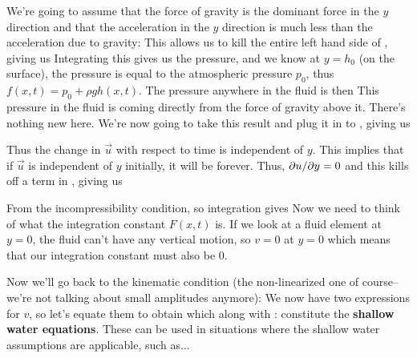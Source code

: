 \documentclass[12pt]{book}
\begin{document}
We're going to assume that the force of gravity is the dominant force in the $y$ direction and that the acceleration in the $y$ direction is much less than the acceleration due to gravity:
This allows us to kill the entire left hand side of , giving us 
Integrating this gives us the pressure,
and we know at $y=h_0$ (on the surface), the pressure is equal to the atmospheric pressure $p_0$, thus
$f(x,t) = p_0 + \rho g h(x,t)$.  The pressure anywhere in the fluid is then
  This pressure in the fluid is coming directly from the force of gravity above it. There's nothing new here.  We're now going to take this result and plug it in to , giving us

Thus the change in $\vec u$ with respect to time is independent of $y$. This implies that if $\vec u$ is independent of $y$ initially, it will be forever.  Thus, $\partial u / \partial y = 0$ and this kills off a term in , giving us

From the incompressibility condition, 
 so integration gives
  Now we need to think of what the integration constant $F(x,t)$ is.  If we look at a fluid element at $y=0$, the fluid can't have any vertical motion, so $v=0$ at $y=0$ which means that our integration constant must also be $0$.

Now we'll go back to the kinematic condition (the non-linearized one of course--we're not talking about small amplitudes anymore):
We now have two expressions for $v$, so let's equate them to obtain
which along with :
constitute the \textbf{shallow water equations}.  These can be used in situations where the shallow water assumptions are applicable, such as...
\end{document}
